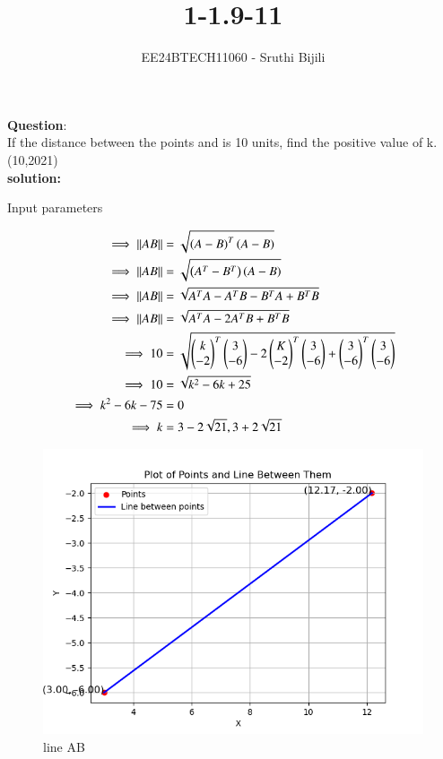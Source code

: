 \documentclass[journal]{IEEEtran}
\begin{document}

\vspace{3cm}

\title{1-1.9-11}
\author{EE24BTECH11060 - Sruthi Bijili}
{\let\newpage\relax\maketitle}

\renewcommand{\thefigure}{\theenumi}
\renewcommand{\thetable}{\theenumi}
\setlength{\intextsep}{10pt} %


\renewcommand{\thetable}{\theenumi}

\textbf{Question}:\\
If the distance between the points  and  is 10 units, find the positive
value of k.
\hfill(10,2021)\\
\textbf{solution:}
\begin{table}[h!]    
  \centering
  
  \caption{Input parameters}
\end{table}
\begin{align}
\implies \left\vert\left\vert AB\right\vert\right\vert&=\sqrt{\left(A-B\right)^T\left(A-B\right)}\\
\implies \left\vert\left\vert AB\right\vert\right\vert&=\sqrt{\left(A^T-B^T\right)\left(A-B\right)}\\
\implies \left\vert\left\vert AB\right\vert\right\vert&=\sqrt{A^TA-A^TB-B^TA+B^TB}\\
\implies \left\vert\left\vert AB\right\vert\right\vert&=\sqrt{A^TA-2A^TB+B^TB}\\
\implies 10 &=\sqrt{\begin{pmatrix}k \\ -2\end{pmatrix}^T\begin{pmatrix}3 \\-6\end{pmatrix}-2\begin{pmatrix}K \\-2\end{pmatrix}^T\begin{pmatrix}3\\-6\end{pmatrix}+\begin{pmatrix}3\\-6\end{pmatrix}^T\begin{pmatrix}3\\-6\end{pmatrix}}\\
\implies 10 &=\sqrt{k^2-6k+25}\\
\implies k^2-6k-75&=0\\
\implies k&=3-2\sqrt{21},3+2\sqrt{21}
\end{align}
\begin{figure}[h!]
   \centering
   \includegraphics[width=0.7\linewidth]{figs/fig1.png}
   \caption{line AB}
\end{figure}
\end{document}
